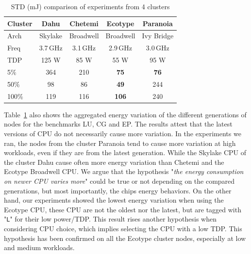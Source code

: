 \begin{table}
    \centering
    \caption{STD (mJ) comparison of experiments from 4 clusters}
    \small
    \begin{tabular}{|l|c|c|c|c|}
        \hline
        \textbf{Cluster} & \textbf{Dahu} & \textbf{Chetemi} & \textbf{Ecotype} & \textbf{Paranoia} \\
        \hline
        \hline
        Arch             & Skylake       & Broadwell        & Broadwell        & Ivy Bridge        \\
        \hline
        Freq             & 3.7\,GHz      & 3.1\,GHz         & 2.9\,GHz         & 3.0\,GHz          \\
        \hline
        TDP              & 125 W         & 85 W             & 55 W             & 95 W              \\
        \hline
        \hline
        5\%              & 364           & 210              & \textbf{75}      & \textbf{76}       \\
        \hline
        50\%             & 98            & 86               & \textbf{49}      & 244               \\
        \hline
        100\%            & 119           & 116              & \textbf{106}     & 240               \\
        \hline
    \end{tabular}
    \label{table:cpus}
\end{table}

Table~\ref{table:cpus} also shows the aggregated energy variation of the different generations of nodes for the benchmarks \textsf{LU}, \textsf{CG} and \textsf{EP}.
The results attest that the latest versions of CPU do not necessarily cause more variation.
In the experiments we ran, the nodes from the cluster \textsf{Paranoia} tend to cause more variation at high workloads, even if they are from the latest generation.
While the Skylake CPU of the cluster \textsf{Dahu} cause often more energy variation than \textsf{Chetemi} and the Ecotype Broadwell CPU.
We argue that the hypothesis "\emph{the energy consumption on newer CPU varies more}" could be true or not depending on the compared generations, but most importantly, the chips energy behaviors.
On the other hand, our experiments showed the lowest energy variation when using the \textsf{Ecotype CPU}, these CPU are not the oldest nor the latest, but are tagged with "\texttt{L}" for their low power/TDP.
This result rises another hypothesis when considering CPU choice, which implies selecting the CPU with a low TDP.
This hypothesis has been confirmed on all the \textsf{Ecotype} cluster nodes, especially at low and medium workloads.

